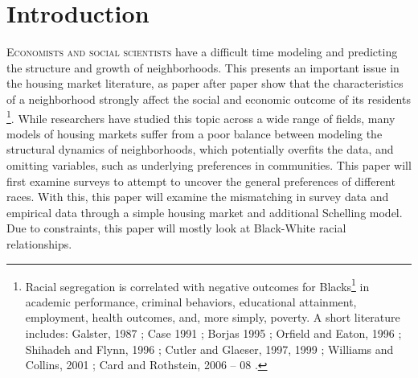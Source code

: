 \begin{savequote}[75mm]

\qauthor{}
\end{savequote}

\chapter{Introduction}
\label{introduction}
{\lettrine[lines=3,slope=1pt,nindent=1pt,]{\textcolor{SchoolColor}{E}}{conomists and social scientists} have a difficult time modeling and predicting the structure and growth of neighborhoods. This presents an important issue in the housing market literature, as paper after paper show that the characteristics of a neighborhood strongly affect the social and economic outcome of its residents \footnote{Racial segregation is correlated with negative outcomes for Blacks\footnote{I use the term "Black" to refer to African-Americans in this paper because most of the surveys in this paper use the term "Black" in their terminology.} in academic performance, criminal behaviors, educational attainment, employment, health outcomes, and, more simply, poverty. A short literature includes: Galster, 1987 \cite{galster87}; Case 1991 \cite{case91}; Borjas 1995 \cite{borjas95}; Orfield and Eaton, 1996 \cite{orfield97}; Shihadeh and Flynn, 1996 \cite{shihadeh96}; Cutler and Glaeser, 1997, 1999 \cite{cutler97,cutler99}; Williams and Collins, 2001 \cite{william01}; Card and Rothstein, 2006 -- 08 \cite{card06,card07,card08}.}. While researchers have studied this topic across a wide range of fields, many models of housing markets suffer from a poor balance between modeling the structural dynamics of neighborhoods, which potentially overfits the data, and omitting variables, such as underlying preferences in communities. This paper will first examine surveys to attempt to uncover the general preferences of different races. With this, this paper will examine the mismatching in survey data and empirical data through a simple housing market and additional Schelling model. Due to constraints, this paper will mostly look at Black-White racial relationships.
%
%
%

}
